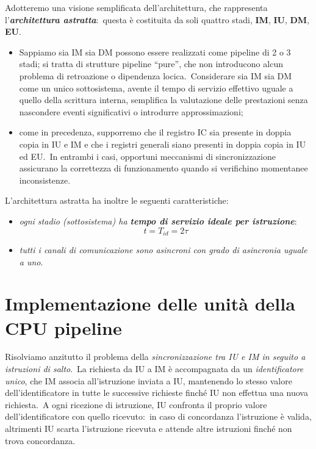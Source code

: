 Adotteremo una visione semplificata dell'architettura, che rappresenta l'\textbf{\textit{ar\-chitettura astratta}}:\ questa è costituita da soli quattro stadi, \textbf{IM}, \textbf{IU}, \textbf{DM}, \textbf{EU}.

\begin{itemize}
    \item Sappiamo sia IM sia DM possono essere realizzati come pipeline di 2 o 3 stadi; si tratta di strutture pipeline ``pure'', che non introducono alcun problema di retroazione o dipendenza locica.\ Considerare sia IM sia DM come un unico sottosistema, avente il tempo di servizio effettivo uguale a quello della scrittura interna, semplifica la valutazione delle prestazioni senza nascondere eventi significativi o introdurre approssimazioni;
    \item come in precedenza, supporremo che il registro IC sia presente in doppia copia in IU e IM e che i registri generali siano presenti in doppia copia in IU ed EU.\ In entrambi i casi, opportuni meccanismi di sincronizzazione assicurano la correttezza di funzionamento quando si verifichino momentanee inconsistenze.
\end{itemize}

\noindent L'architettura astratta ha inoltre le seguenti caratteristiche:

\begin{itemize}
    \item \textit{ogni stadio (sottosistema) ha \textbf{tempo di servizio ideale per istruzione}}: \[t= T_{id}= 2\tau\]
    \item \textit{tutti i canali di comunicazione sono asincroni con grado di asincronia uguale a uno}.
\end{itemize}

\section{Implementazione delle unità della CPU pipeline}

Risolviamo anzitutto il problema della \textit{sincronizzazione tra IU e IM in seguito a istruzioni di salto}.\
La richiesta da IU a IM è accompagnata da un \textit{identificatore unico}, che IM associa all'istruzione inviata a IU, mantenendo lo stesso valore dell'identificatore in tutte le successive richieste finché IU non effettua una nuova richiesta.\
A ogni ricezione di istruzione, IU confronta il proprio valore dell'identificatore con quello ricevuto:\ in caso di concordanza l'istruzione è valida, altrimenti IU scarta l'istruzione ricevuta e attende altre istruzioni finché non trova concordanza.


